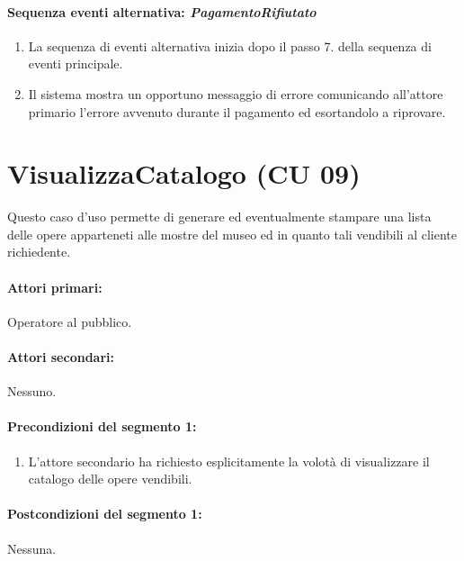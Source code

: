 \documentclass{article}
\begin{document}
	\paragraph{Sequenza eventi alternativa: \emph{PagamentoRifiutato}}
		\begin{enumerate}[itemsep=8pt,parsep=0pt]
				\item La sequenza di eventi alternativa inizia dopo il passo 7. della sequenza di eventi principale.
				\item Il sistema mostra un opportuno messaggio di errore comunicando all'attore primario l'errore avvenuto durante il pagamento ed esortandolo a riprovare.
		\end{enumerate}













\newpage

\section*{VisualizzaCatalogo (CU 09)}

    \indent\indent Questo caso d'uso permette di generare ed eventualmente stampare una lista delle opere apparteneti alle mostre del museo ed in quanto tali vendibili al cliente richiedente.
    
    \paragraph{Attori primari:}Operatore al pubblico.
	
	\paragraph{Attori secondari:}Nessuno.
	
	\paragraph{Precondizioni del segmento 1:}
\begin{enumerate}[itemsep=8pt,parsep=0pt]
	\item L'attore secondario ha richiesto esplicitamente la volotà di visualizzare il catalogo delle opere vendibili.
\end{enumerate}
	
	\paragraph{Postcondizioni del segmento 1:}Nessuna.
	
\end{document}
